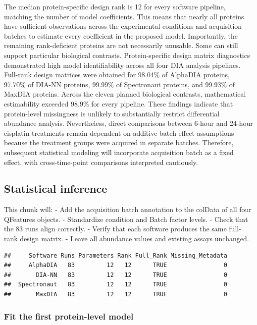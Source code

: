 \documentclass[
  10pt,
]{article}
\begin{document}
The median protein-specific design rank is 12 for every software
pipeline, matching the number of model coefficients. This means that
nearly all proteins have sufficient observations across the experimental
conditions and acquisition batches to estimate every coefficient in the
proposed model. Importantly, the remaining rank-deficient proteins are
not necessarily unusable. Some can still support particular biological
contrasts. Protein-specific design matrix diagnostics demonstrated high
model identifiability across all four DIA analysis pipelines. Full-rank
design matrices were obtained for 98.04\% of AlphaDIA proteins, 97.70\%
of DIA-NN proteins, 99.99\% of Spectronaut proteins, and 99.93\% of
MaxDIA proteins. Across the eleven planned biological contrasts,
mathematical estimability exceeded 98.9\% for every pipeline. These
findings indicate that protein-level missingness is unlikely to
substantially restrict differential abundance analysis. Nevertheless,
direct comparisons between 6-hour and 24-hour cisplatin treatments
remain dependent on additive batch-effect assumptions because the
treatment groups were acquired in separate batches. Therefore,
subsequent statistical modeling will incorporate acquisition batch as a
fixed effect, with cross-time-point comparisons interpreted cautiously.

\subsection{Statistical inference}\label{statistical-inference}

This chunk will: - Add the acquisition batch annotation to the colData
of all four QFeatures objects. - Standardize condition and Batch factor
levels. - Check that the 83 runs align correctly. - Verify that each
software produces the same full-rank design matrix. - Leave all
abundance values and existing assays unchanged.

\begin{verbatim}
##     Software Runs Parameters Rank Full_Rank Missing_Metadata
##     AlphaDIA   83         12   12      TRUE                0
##       DIA-NN   83         12   12      TRUE                0
##  Spectronaut   83         12   12      TRUE                0
##       MaxDIA   83         12   12      TRUE                0
\end{verbatim}

\subsubsection{Fit the first protein-level
model}\label{fit-the-first-protein-level-model}
\end{document}
